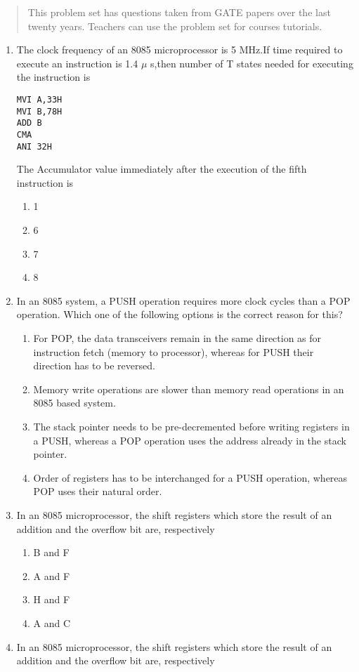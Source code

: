 \documentclass[journal,12pt,twocolumn]{IEEEtran}
\begin{document}

\bigskip

\begin{abstract}
This problem set has questions taken from GATE papers over the last twenty years.  Teachers can use the problem set for courses tutorials. 
 
\end{abstract}
\begin{enumerate}
\item The clock frequency of an 8085 microprocessor is 5 MHz.If time required to execute an instruction is 1.4 $\mu$ s,then number of T states needed for executing the instruction is 
\begin{verbatim}
MVI A,33H      
MVI B,78H        
ADD B
CMA
ANI 32H
\end{verbatim}
The Accumulator value immediately after the execution of the fifth instruction is
      \begin{enumerate}
      \item 1
      \item 6
      \item 7
      \item 8
      \end{enumerate}
 
\item In an 8085 system, a PUSH operation requires more clock cycles than a POP operation. Which one
of the following options is the correct reason for this?
  
      \begin{enumerate}
      \item  For POP, the data transceivers remain in the same direction as for instruction fetch (memory to processor), whereas for PUSH their direction has to be reversed. 
      \item Memory write operations are slower than memory read operations in an 8085 based system.
      \item The stack pointer needs to be pre-decremented before writing registers in a PUSH, whereas a
POP operation uses the address already in the stack pointer.
      \item Order of registers has to be interchanged for a PUSH operation, whereas POP uses their natural order.
      \end{enumerate}
\item In an 8085 microprocessor, the shift registers which store the result of an addition and the overflow bit are, respectively
      \begin{enumerate}
      \item B and F
      \item A and F
      \item H and F
      \item A and C
      \end{enumerate}
\item In an 8085 microprocessor, the shift registers which store the result of an addition and the overflow bit are, respectively


\end{enumerate}
\end{document}
